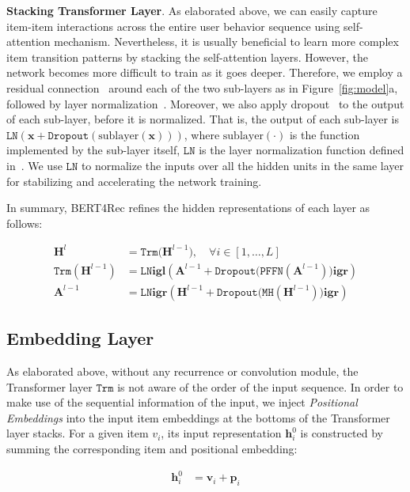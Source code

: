 \textbf{Stacking Transformer Layer}. As elaborated above, we can easily capture item-item interactions across the entire user behavior sequence using self-attention mechanism. Nevertheless, it is usually beneficial to learn more complex item transition patterns by stacking the self-attention layers. However, the network becomes more difficult to train as it goes deeper. Therefore, we employ a residual connection~\cite{He:cvpr2016:resnet} around each of the two sub-layers as in Figure~\ref{fig:model}a, followed by layer normalization~\cite{Lei:Layer}. Moreover, we also apply dropout~\cite{Srivastava:jmlr15:Dropout} to the output of each sub-layer, before it is normalized. That is, the output of each sub-layer is $\texttt{LN}(\bm{x} + \texttt{Dropout}(\text{sublayer}(\bm{x})))$, where $\text{sublayer}(\cdot)$ is the function implemented by the sub-layer itself, $\texttt{LN}$ is the layer normalization function defined in~\cite{Lei:Layer}. We use $\texttt{LN}$ to normalize the inputs over all the hidden units in the same layer for stabilizing and accelerating the network training.

In summary, BERT4Rec refines the hidden representations of each layer as follows:

\begin{align}
    \bm{H}^l &= \mathtt{Trm}\bigl(\bm{H}^{l-1}\bigr), \quad \forall i \in [1,\dots, L] \\
    \mathtt{Trm}(\bm{H}^{l-1}) &= \mathtt{LN}\mathbf{igl}(\bm{A}^{l-1} +  \mathtt{Dropout}\bigl(\mathtt{PFFN}(\bm{A}^{l-1})\bigr)\mathbf{igr}) \\
    \bm{A}^{l-1} &= \mathtt{LN}\mathbf{igr}(\bm{H}^{l-1} + \mathtt{Dropout}\bigl(\mathtt{MH}(\bm{H}^{l-1})\bigr)\mathbf{igr}) 
\end{align}

\subsection{Embedding Layer} As elaborated above, without any recurrence or convolution module, the Transformer layer $\mathtt{Trm}$ is not aware of the order of the input sequence. In order to make use of the sequential information of the input, we inject \textit{Positional Embeddings} into the input item embeddings at the bottoms of the Transformer layer stacks. For a given item $v_i$, its input representation $\bm{h}_i^0$ is constructed by summing the corresponding item and positional embedding:

\begin{equation*}
    \begin{aligned}
        \bm{h}_{i}^0 &= \bm{v}_i + \bm{p}_i
    \end{aligned}
\end{equation*}

